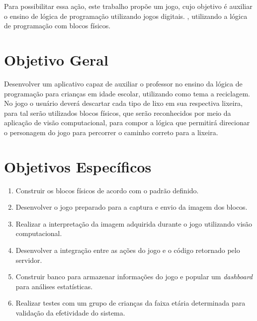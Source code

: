 Para possibilitar essa ação, este trabalho propõe um jogo, cujo objetivo é auxiliar o ensino de lógica de programação utilizando jogos digitais. \cite{onu_2015}, utilizando a lógica de programação com blocos físicos.

\section{Objetivo Geral}

Desenvolver um aplicativo capaz de auxiliar o professor no ensino da lógica de programação para crianças em idade escolar, utilizando como tema a reciclagem. No jogo o usuário deverá descartar cada tipo de lixo em sua respectiva lixeira, para tal serão utilizados blocos físicos, que serão reconhecidos por meio da aplicação de visão computacional, para compor a lógica que permitirá direcionar o personagem do jogo para percorrer o caminho correto para a lixeira.

\section{Objetivos Específicos}

\begin{enumerate}
    \item Construir os blocos físicos de acordo com o padrão definido.
    \item Desenvolver o jogo preparado para a captura e envio da imagem dos blocos.
    \item Realizar a interpretação da imagem adquirida durante o jogo utilizando visão computacional.
    \item Desenvolver a integração entre as ações do jogo e o código retornado pelo servidor.
    \item Construir banco para armazenar informações do jogo e popular um \textit{dashboard} para análises estatísticas.
    \item Realizar testes com um grupo de crianças da faixa etária determinada para validação da efetividade do sistema.
\end{enumerate}
